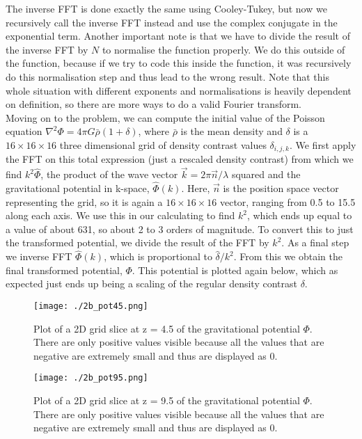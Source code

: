 The inverse FFT is done exactly the same using Cooley-Tukey, but now we recursively call the inverse FFT instead and use the complex conjugate in the exponential term. Another important note is that we have to divide the result of the inverse FFT by $N$ to normalise the function properly. We do this outside of the function, because if we try to code this inside the function, it was recursively do this normalisation step and thus lead to the wrong result. Note that this whole situation with different exponents and normalisations is heavily dependent on definition, so there are  more ways to do a valid Fourier transform.\\

Moving on to the problem, we can compute the initial value of the Poisson equation $\nabla^2 \Phi = 4\pi G \bar{\rho} (1 + \delta)$, where $\bar{\rho}$ is the mean density and $\delta$ is a $16 \times 16 \times 16$ three dimensional grid of density contrast values $\delta_{i,j,k}$. We first apply the FFT on this total expression (just a rescaled density contrast) from which we find $k^2 \hat{\Phi}$, the product of the wave vector $\vec{k} = 2\pi \vec{n}/\lambda$ squared and the gravitational potential in k-space, $\hat{\Phi}(k)$. Here, $\vec{n}$ is the position space vector representing the grid, so it is again a $16 \times 16 \times 16$ vector, ranging from 0.5 to 15.5 along each axis. We use this in our calculating to find $k^2$, which ends up equal to a value of about 631, so about 2 to 3 orders of magnitude. To convert this to just the transformed potential, we divide the result of the FFT by $k^2$. As a final step we inverse FFT $\hat{\Phi}(k)$, which is proportional to $\hat{\delta}/k^2$. From this we obtain the final transformed potential, $\Phi$. This potential is plotted again below, which as expected just ends up being a scaling of the regular density contrast $\delta$.\\


\begin{figure}[h!]
  \centering
  \texttt{[image: ./2b\_pot45.png]}
  \caption{Plot of a 2D grid slice at z = 4.5 of the gravitational potential $\Phi$. There are only positive values visible because all the values that are negative are extremely small and thus are displayed as 0.}
\end{figure}

\begin{figure}[h!]
  \centering
  \texttt{[image: ./2b\_pot95.png]}
  \caption{Plot of a 2D grid slice at z = 9.5 of the gravitational potential $\Phi$. There are only positive values visible because all the values that are negative are extremely small and thus are displayed as 0.}
\end{figure}

